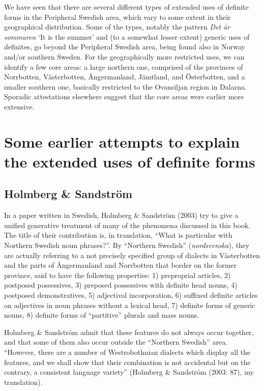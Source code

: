 \begin{styleBodyTextFirst}
We have seen that there are several different types of extended uses of definite forms in the Peripheral Swedish area, which vary to some extent in their geographical distribution. Some of the types, notably the pattern \textit{Det är sommaren} ‘It is the summer’  and (to a somewhat lesser extent) generic uses of definites, go beyond the Peripheral Swedish area, being found also in Norway and/or southern Sweden. For the geographically more restricted uses, we can identify a few core areas: a large northern one, comprised of the provinces of Norrbotten, Västerbotten, Ångermanland, Jämtland, and Österbotten, and a smaller southern one, basically restricted to the Ovansiljan region in Dalarna. Sporadic attestations elsewhere suggest that the core areas were earlier more extensive.

\end{styleBodyTextFirst}

\section{\rmfamily\bfseries Some earlier attempts to explain the extended uses of definite forms}
\subsection{\rmfamily Holmberg \& Sandström}

\begin{styleBodyTextFirst}
In a paper written in Swedish, Holmberg \& Sandström (2003) try to give a unified generative treatment of many of the phenomena discussed in this book. The title of their contribution is, in translation, “What is particular with Northern Swedish noun phrases?”. By “Northern Swedish” (\textit{nordsvenska}), they are actually referring to a not precisely specified group of dialects in Västerbotten and the parts of Ångermanland and Norrbotten that border on the former province, said to have the following properties: 1) preproprial articles, 2) postposed possessives, 3) preposed possessives with definite head nouns, 4) postposed demonstratives, 5) adjectival incorporation, 6) suffixed definite articles on adjectives in noun phrases without a lexical head, 7) definite forms of generic nouns, 8) definite forms of “partitive” plurals and mass nouns.

\end{styleBodyTextFirst}

\begin{styleBodytextC}
Holmberg \& Sandström admit that these features do not always occur together, and that some of them also occur outside the “Northern Swedish” area. “However, there are a number of Westrobothnian dialects which display all the features, and we shall show that their combination is not accidental but on the contrary, a consistent language variety” (Holmberg \& Sandström (2003: 87), my translation).

\end{styleBodytextC}

